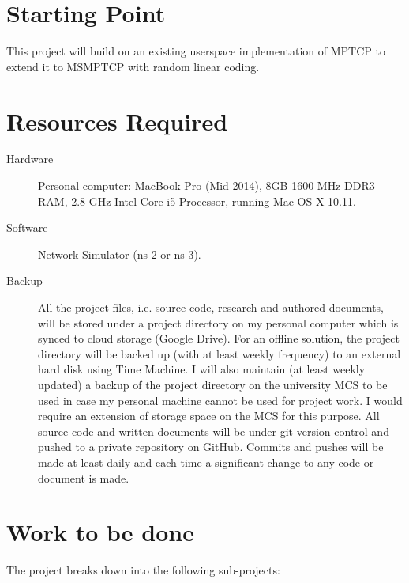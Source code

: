 \documentclass[12pt,a4paper,twoside]{article}
\begin{document}
\section*{Starting Point}

This project will build on an existing userspace implementation of MPTCP to extend it to MSMPTCP with random linear coding.

\section*{Resources Required}

\begin{description}
  \item[Hardware] Personal computer: MacBook Pro (Mid 2014), 8GB 1600 MHz DDR3 RAM, 2.8 GHz Intel Core i5 Processor, running Mac OS X 10.11.
  \item[Software] Network Simulator (ns-2 or ns-3).
  \item[Backup] All the project files, i.e. source code, research and authored documents, will be stored under a project directory on my personal computer which is synced to cloud storage (Google Drive). For an offline solution, the project directory will be backed up (with at least weekly frequency) to an external hard disk using Time Machine. I will also maintain (at least weekly updated) a backup of the project directory on the university MCS to be used in case my personal machine cannot be used for project work. I would require an extension of storage space on the MCS for this purpose. All source code and written documents will be under git version control and pushed to a private repository on GitHub. Commits and pushes will be made at least daily and each time a significant change to any code or document is made. 
\end{description}

\section*{Work to be done}

The project breaks down into the following sub-projects:
\end{document}
